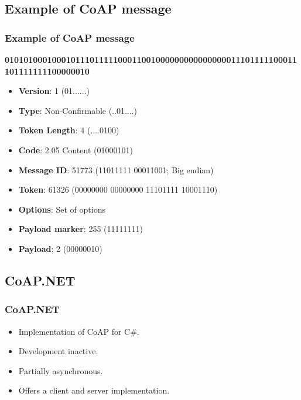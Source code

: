 \documentclass[11pt,t,usepdftitle=false,aspectratio=169,usenames,dvipsnames]{beamer}
\begin{document}
    \subsection{Example of CoAP message}
    \begin{frame}
        \frametitle{Example of CoAP message}
        \textcolor{uibkblue}{\textbf{01}}\textcolor{uibkorange}{\textbf{01}}\textcolor{uibkblue}{\textbf{0100}}\textcolor{uibkorange}{\textbf{01000101}}\textcolor{uibkblue}{\textbf{1101111100011001}}\textcolor{uibkorange}{\textbf{00000000000000001110111110001110}}\textcolor{uibkblue}
        \textcolor{uibkorange}{\textbf{11111111}}\textcolor{uibkblue}{\textbf{00000010}}
        \begin{itemize}
            \item \textcolor{uibkblue}{\textbf{Version}}: 1 (01......)
            \item \textcolor{uibkorange}{\textbf{Type}}: Non-Confirmable (..01....)
            \item \textcolor{uibkblue}{\textbf{Token Length}}: 4 (....0100)
            \item \textcolor{uibkorange}{\textbf{Code}}: 2.05 Content (01000101)
            \item \textcolor{uibkblue}{\textbf{Message ID}}: 51773 (11011111 00011001; Big endian)
            \item \textcolor{uibkorange}{\textbf{Token}}: 61326 (00000000 00000000 11101111 10001110)
            \item \textcolor{uibkblue}{\textbf{Options}}: Set of options
            \item \textcolor{uibkorange}{\textbf{Payload marker}}: 255 (11111111)
            \item \textcolor{uibkblue}{\textbf{Payload}}: 2 (00000010)
        \end{itemize}
    \end{frame}

    \subsection{CoAP.NET}
    \begin{frame}
        \frametitle{CoAP.NET}
        \begin{itemize}
            \item<1-> Implementation of CoAP for C\#.
            \item<2-> Development inactive.
            \item<3-> Partially asynchronous.
            \item<4-> Offers a client and server implementation.
        \end{itemize}
    \end{frame}
\end{document}
